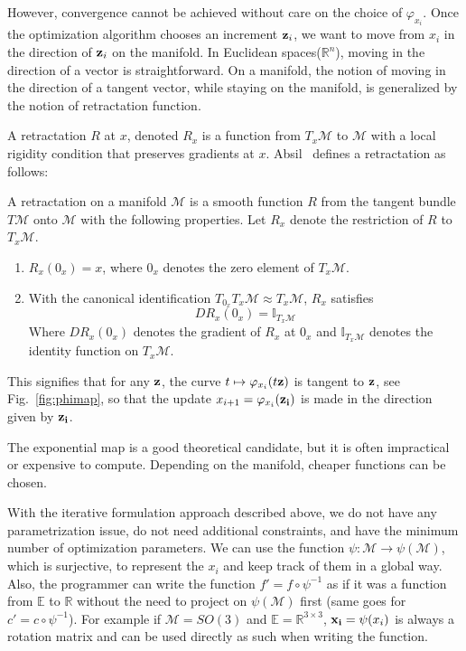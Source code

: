 However, convergence cannot be achieved without care on the choice of $\varphi_{x_i}$.
Once the optimization algorithm chooses an increment ${\bf z}_i$, we want to move from $x_i$ in the direction of ${\bf z}_i$ on the manifold.
In Euclidean spaces($\mathbb{R}^n$), moving in the direction of a vector is straightforward.
On a manifold, the notion of moving in the direction of a tangent vector, while staying on the manifold, is generalized by the notion of retractation function.

A retractation $R$ at $x$, denoted $R_x$ is a function from $T_x{\mathcal{M}}$ to $\mathcal{M}$ with a local rigidity condition that preserves gradients at $x$.
Absil~\cite{absil:book:2008} defines a retractation as follows:
\begin{definition}
A retractation on a manifold $\mathcal{M}$ is a smooth function $R$ from the tangent bundle $T\mathcal{M}$ onto $\mathcal{M}$ with the following properties.
Let $R_x$ denote the restriction of $R$ to $T_x\mathcal{M}$.
\begin{enumerate}
  \item $R_x(0_x) = x$, where $0_x$ denotes the zero element of $T_x\mathcal{M}$.
  \item With the canonical identification $T_{0_x}T_x\mathcal{M}\approx T_x\mathcal{M}$, $R_x$ satisfies
  \begin{equation}
    DR_x(0_x) = \mathbb{I}_{T_x\mathcal{M}}
  \end{equation}
  Where $DR_x(0_x)$ denotes the gradient of $R_x$ at $0_x$ and $\mathbb{I}_{T_x\mathcal{M}}$ denotes the identity function on $T_x\mathcal{M}$.
\end{enumerate}
\end{definition}

This signifies that for any ${\bf z}$, the curve $t \mapsto \varphi_{x_i}(t{\bf z})$ is tangent to ${\bf z}$, see Fig.~\ref{fig:phimap}, so that the update $x_{i+1} = \varphi_{x_i}({\bf z_i})$ is made in the direction given by ${\bf z_i}$.

The exponential map is a good theoretical candidate, but it is often impractical or expensive to compute.
Depending on the manifold, cheaper functions can be chosen.

With the iterative formulation approach described above, we do not have any parametrization issue, do not need additional constraints, and have the minimum number of optimization parameters.
We can use the function $\psi:\mathcal{M} \rightarrow \psi(\mathcal{M})$, which is surjective, to represent the $x_i$ and keep track of them in a global way.
Also, the programmer can write the function $f' = f \circ \psi^{-1}$ as if it was a function from $\mathbb{E}$ to $\mathbb{R}$ without the need to project on $\psi(\mathcal{M})$ first (same goes for $c' = c \circ \psi^{-1}$).
For example if $\mathcal{M} = SO(3)$ and $\mathbb{E} = \mathbb{R}^{3\times 3}$, ${\bf x_i}=\psi(x_i)$ is always a rotation matrix and can be used directly as such when writing the function.


